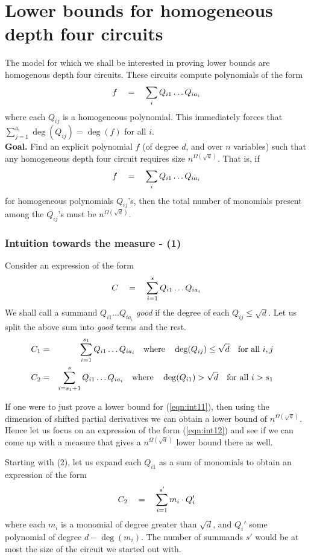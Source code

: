 \chapter{Lower bounds for homogeneous depth four circuits}\label{chap:d4hom}

The model for which we shall be interested in proving lower bounds are homogenous depth four circuits. 
These circuits compute polynomials of the form
\[
f \quad = \quad \sum_{i} Q_{i1}\dots Q_{ia_i}
\]
where each $Q_{ij}$ is a homogeneous polynomial. 
This immediately forces that $\sum_{j=1}^{a_i} \deg(Q_{ij}) = \deg(f)$ for all $i$. \\

{\bf Goal. } Find an explicit polynomial $f$ (of degree $d$, and over $n$ variables) such that any homogeneous depth four circuit requires size $n^{\Omega(\sqrt{d})}$. 
That is, if
\[
f \quad = \quad \sum_{i} Q_{i1}\dots Q_{ia_i}
\]
for homogeneous polynomials $Q_{ij}$'s, then the total number of monomials present among the $Q_{ij}$'s must be $n^{\Omega(\sqrt{d})}$. 

\subsection*{Intuition towards the measure - (1)}

Consider an expression of the form
\[
C \quad = \quad \sum_{i=1}^s Q_{i1}\dots Q_{ia_i}
\]
We shall call a summand $Q_{i1}\dots Q_{ia_i}$ \emph{good} if the degree of each $Q_{ij} \leq \sqrt{d}$. 
Let us split the above sum into \emph{good} terms and the rest. 
\begin{eqnarray}
C_1 &=& \sum_{i=1}^{s_1} Q_{i1}\dots Q_{ia_i} \quad \text{where} \quad \deg(Q_{ij}) \leq \sqrt{d} \quad \text{for all $i,j$} \quad\label{eqn:int11}\\
C_2 &=& \sum_{i=s_1+1}^{s} Q_{i1}\dots Q_{ia_i} \quad \text{where} \quad \deg(Q_{i1}) > \sqrt{d} \quad \text{for all $i > s_1$} \quad\label{eqn:int12}
\end{eqnarray}

If one were to just prove a lower bound for (\ref{eqn:int11}), then using the dimension of shifted partial derivatives we can obtain a lower bound of $n^{\Omega(\sqrt{d})}$. 
Hence let us focus on an expression of the form (\ref{eqn:int12}) and see if we can come up with a measure that gives a $n^{\Omega(\sqrt{d})}$ lower bound there as well. 

Starting with (2), let us expand each $Q_{i1}$ as a sum of monomials to obtain an expression of the form
\[
C_2 \quad = \quad \sum_{i=1}^{s'} m_i\cdot  Q_i'
\]
where each $m_i$ is a monomial of degree greater than $\sqrt{d}$, and $Q_i'$ some polynomial of degree $d - \deg(m_i)$. 
The number of summands $s'$ would be at most the size of the circuit we started out with.\\

